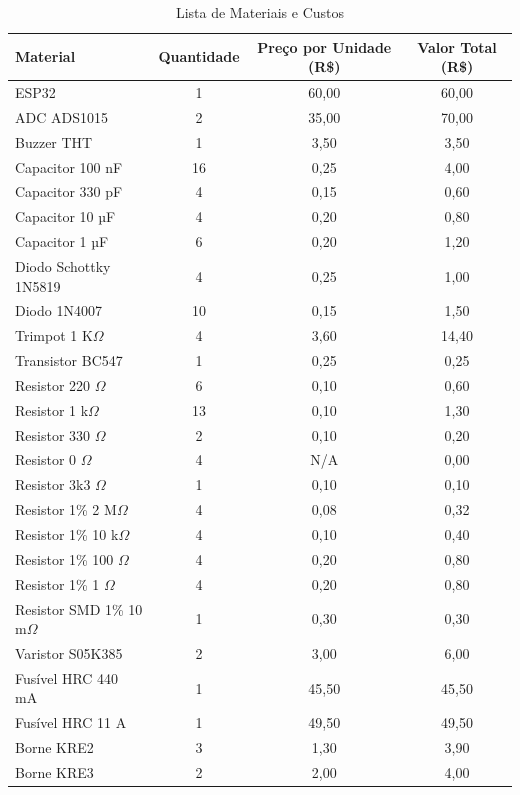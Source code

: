 \begin{table}[h!]
\centering
\caption{Lista de Materiais e Custos}
\label{tab:Bookofmaterials}
\begin{tabular}{|l|c|c|c|}
\hline
\textbf{Material} & \textbf{Quantidade} & \textbf{Preço por Unidade (R\$)} & \textbf{Valor Total (R\$)} \\ \hline
ESP32 & 1 & 60,00 & 60,00 \\ \hline
ADC ADS1015 & 2 & 35,00 & 70,00 \\ \hline
Buzzer THT & 1 & 3,50 & 3,50 \\ \hline
Capacitor 100 nF & 16 & 0,25 & 4,00 \\ \hline
Capacitor 330 pF & 4 & 0,15 & 0,60 \\ \hline
Capacitor 10 µF & 4 & 0,20 & 0,80 \\ \hline
Capacitor 1 µF & 6 & 0,20 & 1,20 \\ \hline
Diodo Schottky 1N5819 & 4 & 0,25 & 1,00 \\ \hline
Diodo 1N4007 & 10 & 0,15 & 1,50 \\ \hline
Trimpot 1 K$\Omega$ & 4 & 3,60 & 14,40 \\ \hline
Transistor BC547 & 1 & 0,25 & 0,25 \\ \hline
Resistor 220 $\Omega$ & 6 & 0,10 & 0,60 \\ \hline
Resistor 1 k$\Omega$ & 13 & 0,10 & 1,30 \\ \hline
Resistor 330 $\Omega$ & 2 & 0,10 & 0,20 \\ \hline
Resistor 0 $\Omega$ & 4 & N/A & 0,00 \\ \hline
Resistor 3k3 $\Omega$ & 1 & 0,10 & 0,10 \\ \hline
Resistor 1\% 2 M$\Omega$ & 4 & 0,08 & 0,32 \\ \hline
Resistor 1\% 10 k$\Omega$ & 4 & 0,10 & 0,40 \\ \hline
Resistor 1\% 100 $\Omega$ & 4 & 0,20 & 0,80 \\ \hline
Resistor 1\% 1 $\Omega$ & 4 & 0,20 & 0,80 \\ \hline
Resistor SMD 1\% 10 m$\Omega$ & 1 & 0,30 & 0,30 \\ \hline
Varistor S05K385 & 2 & 3,00 & 6,00 \\ \hline
Fusível HRC 440 mA & 1 & 45,50 & 45,50 \\ \hline
Fusível HRC 11 A & 1 & 49,50 & 49,50 \\ \hline
Borne KRE2 & 3 & 1,30 & 3,90 \\ \hline
Borne KRE3 & 2 & 2,00 & 4,00 \\ \hline

\end{tabular}
\end{table}

